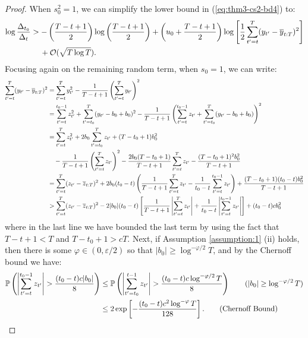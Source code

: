 \begin{proof}
When $s_0^2 = 1$, we can simplify the lower bound in (\ref{eq:thm3-cs2-bd4}) to:
\begin{align}
    \log \frac{\Delta_{t_0}}{\Delta_t} &> - \left(\frac{T - t + 1}{2}\right) \log\left(\frac{T-t+1}{2}\right) + \left(u_0 + \frac{T - t +1}{2}\right)\log\left[ \frac{1}{2}\sum_{t'=t}^T (y_{t'} - \overline{y}_{t:T})^2 \right] \notag \\
    &\quad\: +  \mathcal{O}(\sqrt{T \log T}). \label{eq:thm3-cs2-bd7}
\end{align}
Focusing again on the remaining random term, when $s_0 = 1$, we can write:
\small
\begin{align}
    \sum_{t'=t}^T (y_{t'} - \overline{y}_{t:T})^2 &= \sum_{t'=t}^T y^2_{t'} - \frac{1}{T-t+1}\left(\sum_{t'=t}^T y_{t'} \right)^2 \notag \\
    &= \sum_{t'=t}^{t_0-1} z^2_{t'} + \sum_{t'=t_0}^T (y_{t'} - b_0 + b_0)^2 - \frac{1}{T-t+1}\left(\sum_{t'=t}^{t_0-1} z_{t'} + \sum_{t'=t_0}^T (y_{t'} - b_0 + b_0)\right)^2 \notag \\
    &= \sum_{t'=t}^T z^2_{t'} + 2b_0\sum_{t'=t_0}^T z_{t'} + (T - t_0 + 1)b_0^2 \notag \\
    &\quad - \frac{1}{T-t+1}\left(\sum_{t'=t}^T z_{t'} \right)^2  - \frac{2b_0(T-t_0+1)}{T-t+1}\sum_{t'=t}^T z_{t'} - \frac{(T-t_0+1)^2b_0^2}{T-t+1} \notag \\
    &=  \sum_{t'=t}^T (z_{t'} - \overline{z}_{t:T})^2 + 2b_0(t_0-t)\left(\frac{1}{T-t+1} \sum_{t'=t}^T z_{t'} - \frac{1}{t_0-t}\sum_{t' = t}^{t_0 - 1} z_{t'}\right) + \frac{(T-t_0+1)(t_0-t)b_0^2}{T-t+1} \notag \\
    &> \sum_{t'=t}^T (z_{t'} - \overline{z}_{t:T})^2 - 2|b_0|(t_0-t)\left[\frac{1}{T-t+1} \left|\sum_{t'=t}^T z_{t'}\right| + \frac{1}{t_0-t}\left|\sum_{t' = t}^{t_0 - 1} z_{t'}\right|\right] + (t_0-t)cb_0^2 \label{eq:thm3-cs2-bd8}
\end{align}
\normalsize
where in the last line we have bounded the last term by using the fact that $T-t+1 < T$ and $T-t_0 + 1 > cT$. Next, if Assumption \ref{assumption:1} (ii) holds, then there is some $\varphi \in (0, \varepsilon/2)$ so that $|b_0| \geq \log^{-\varphi/2}T$, and by the Chernoff bound we have:
\begin{align*}
    \mathbb{P}\left(\left|\sum_{t'=t}^{t_0-1} z_{t'}\right| > \frac{(t_0-t) c|b_0|}{8}\right) &\leq \mathbb{P}\left(\left|\sum_{t'=t_0}^{t-1} z_{t'}\right| > \frac{(t_0-t) c\log^{-\varphi/2}T}{8}\right) \tag{$|b_0| \geq \log^{-\varphi/2}T$} \\
    &\leq 2 \exp\left[- \frac{(t_0-t)c^2\log^{-\varphi}T}{128}\right]. \tag{Chernoff Bound}

\end{align*}
\end{proof}
